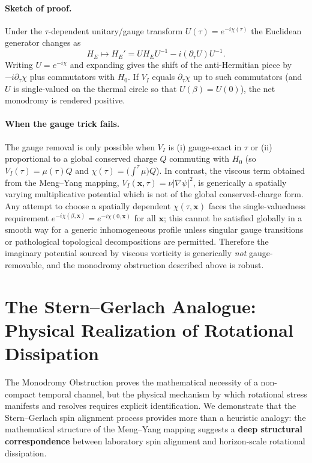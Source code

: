 \documentclass[11pt]{article}
\begin{document}
\paragraph{Sketch of proof.}
Under the \(\tau\)-dependent unitary/gauge transform \(U(\tau)=e^{-i\chi(\tau)}\) the Euclidean generator changes as
\[
H_E \mapsto H_E' = U H_E U^{-1} - i(\partial_\tau U)U^{-1} .
\]
Writing \(U=e^{-i\chi}\) and expanding gives the shift of the anti-Hermitian piece by \(-i\partial_\tau\chi\) plus commutators with \(H_0\). If \(V_I\) equals \(\partial_\tau\chi\) up to such commutators (and \(U\) is single-valued on the thermal circle so that \(U(\beta)=U(0)\)), the net monodromy is rendered positive.

\paragraph{When the gauge trick fails.}
The gauge removal is only possible when \(V_I\) is (i) gauge-exact in \(\tau\) or (ii) proportional to a global conserved charge \(Q\) commuting with \(H_0\) (so \(V_I(\tau)=\mu(\tau)Q\) and \(\chi(\tau)=\big(\int^\tau \mu\big)Q\)). In contrast, the viscous term obtained from the Meng--Yang mapping, \(V_I(\mathbf x,\tau)=\nu|\nabla\psi|^2\), is generically a spatially varying multiplicative potential which is not of the global conserved-charge form. Any attempt to choose a spatially dependent \(\chi(\tau,\mathbf x)\) faces the single-valuedness requirement \(e^{-i\chi(\beta,\mathbf x)}=e^{-i\chi(0,\mathbf x)}\) for all \(\mathbf x\); this cannot be satisfied globally in a smooth way for a generic inhomogeneous profile unless singular gauge transitions or pathological topological decompositions are permitted. Therefore the imaginary potential sourced by viscous vorticity is generically \emph{not} gauge-removable, and the monodromy obstruction described above is robust.

\section{The Stern--Gerlach Analogue: Physical Realization of Rotational Dissipation}

The Monodromy Obstruction proves the mathematical necessity of a non-compact temporal 
channel, but the physical mechanism by which rotational stress manifests and resolves 
requires explicit identification. We demonstrate that the Stern--Gerlach spin alignment 
process provides more than a heuristic analogy: the mathematical structure of the 
Meng--Yang mapping suggests a \textbf{deep structural correspondence} between laboratory 
spin alignment and horizon-scale rotational dissipation.
\end{document}
